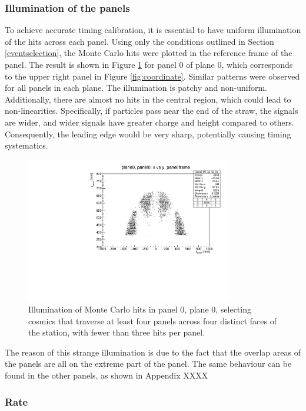 \subsubsection{Illumination of the panels}
To achieve accurate timing calibration, it is essential to have uniform illumination of the hits across each panel. 
Using only the conditions outlined in Section \ref{eventselection}, the Monte Carlo hits were plotted in the reference frame of the panel. 
The result is shown in Figure \ref{fig:illumination} for panel 0 of plane 0, which corresponds to the upper right panel in Figure 
\ref{fig:coordinate}. Similar patterns were observed for all panels in each plane. The illumination is 
patchy and non-uniform. Additionally, there are almost no hits in the central region, which could lead to non-linearities. 
Specifically, if particles pass near the end of the straw, the signals are wider, and wider signals have greater charge and 
height compared to others. Consequently, the leading edge would be very sharp, potentially causing timing systematics.
\begin{figure}[!h]
    \centering
    \includegraphics[width =0.8\textwidth]{figures/pdf/xp_vs_yp_panel0.pdf}
    \caption{Illumination of Monte Carlo hits in panel 0, plane 0, selecting cosmics that traverse at 
    least four panels across four distinct faces of the station, with fewer than three hits per panel.}
    \label{fig:illumination}
\end{figure}
The reason of this strange illumination is due to the fact that the overlap areas of the panels are all on the extreme part of the panel.
The same behaviour can be found in the other panels, as shown in Appendix XXXX
\subsubsection{Rate}
